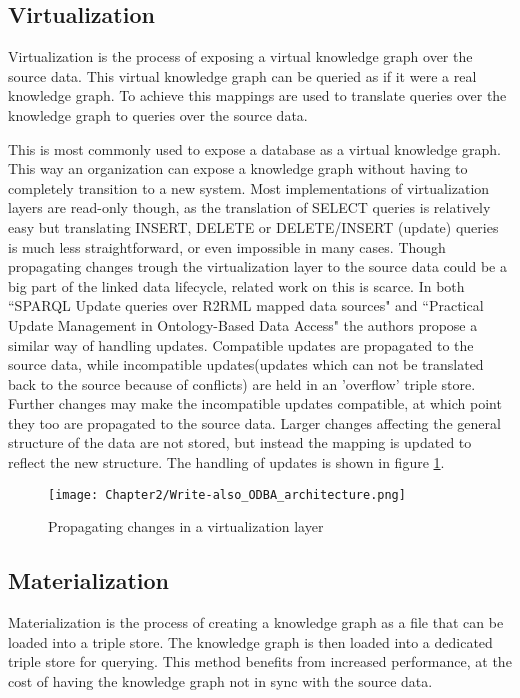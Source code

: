 \subsection{Virtualization}
Virtualization is the process of exposing a virtual knowledge graph over the source data. This virtual knowledge graph can be queried as if it were a real knowledge graph. To achieve this mappings are used to translate queries over the knowledge graph to queries over the source data.

This is most commonly used to expose a database as a virtual knowledge graph. This way an organization can expose a knowledge graph without having to completely transition to a new system. Most implementations of virtualization layers are read-only though, as the translation of SELECT queries is relatively easy but translating INSERT, DELETE or DELETE/INSERT (update) queries is much less straightforward, or even impossible in many cases. Though propagating changes trough the virtualization layer to the source data could be a big part of the linked data lifecycle, related work on this is scarce. In both ``SPARQL Update queries over R2RML mapped data sources" \citep{unbehauen-k-2017--sparqlUpdate} and ``Practical Update Management in Ontology-Based Data Access" \citep{practical_update_management_in_ontology_based_data_access} the authors propose a similar way of handling updates. Compatible updates are propagated to the source data, while incompatible updates(updates which can not be translated back to the source because of conflicts) are held in an 'overflow' triple store. Further changes may make the incompatible updates compatible, at which point they too are propagated to the source data. Larger changes affecting the general structure of the data are not stored, but instead the mapping is updated to reflect the new structure. The handling of updates is shown in figure \ref{fig:virtualization_update}.

\begin{figure}
    \centering
    \texttt{[image: Chapter2/Write-also\_ODBA\_architecture.png]}
    \caption{Propagating changes in a virtualization layer \citep{unbehauen-k-2017--sparqlUpdate} }
    \label{fig:virtualization_update}
\end{figure}

\subsection{Materialization}
Materialization is the process of creating a knowledge graph as a file that can be loaded into a triple store. The knowledge graph is then loaded into a dedicated triple store for querying. This method benefits from increased performance, at the cost of having the knowledge graph not in sync with the source data.

